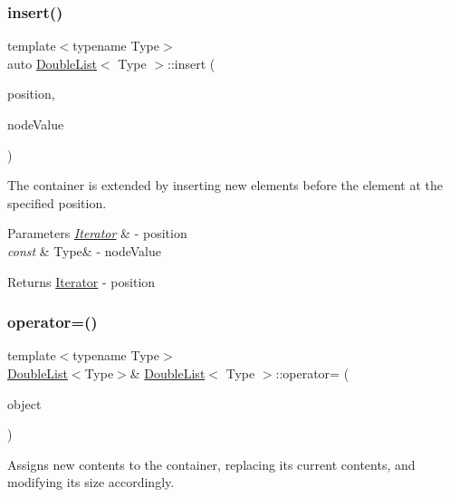 \subsubsection{\texorpdfstring{insert()}{insert()}}
{\footnotesize\ttfamily template$<$typename Type$>$ \\
auto \hyperlink{classDoubleList}{Double\+List}$<$ Type $>$\+::insert (\begin{DoxyParamCaption}\item[{\hyperlink{classDoubleList_1_1Iterator}{Iterator}}]{position,  }\item[{const Type \&}]{node\+Value }\end{DoxyParamCaption})}



The container is extended by inserting new elements before the element at the specified position. 


\begin{DoxyParams}{Parameters}
{\em \hyperlink{classDoubleList_1_1Iterator}{Iterator}} & -\/ position \\
\hline
{\em const} & Type\& -\/ node\+Value \\
\hline
\end{DoxyParams}
\begin{DoxyReturn}{Returns}
\hyperlink{classDoubleList_1_1Iterator}{Iterator} -\/ position 
\end{DoxyReturn}
\mbox{\label{classDoubleList_afe14167dc2c38016a1a03e5d72597d6a}} 
\subsubsection{\texorpdfstring{operator=()}{operator=()}}
{\footnotesize\ttfamily template$<$typename Type$>$ \\
\hyperlink{classDoubleList}{Double\+List}$<$Type$>$\& \hyperlink{classDoubleList}{Double\+List}$<$ Type $>$\+::operator= (\begin{DoxyParamCaption}\item[{const \hyperlink{classDoubleList}{Double\+List}$<$ Type $>$ \&}]{object }\end{DoxyParamCaption})}



Assigns new contents to the container, replacing its current contents, and modifying its size accordingly. 


